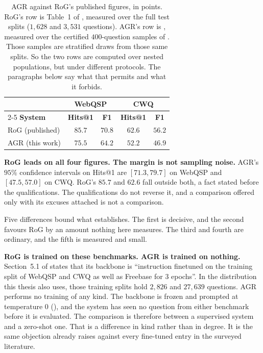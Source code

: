 \begin{table}[!tb]
  \begin{center}
    \caption[AGR against RoG's published figures]{AGR against RoG's published
    figures, in points. RoG's row is Table~1 of \cite{luo2024reasoning},
    measured over the full test splits ($1{,}628$ and $3{,}531$ questions).
    AGR's row is , measured over the certified $400$-question
    samples of . Those samples are stratified draws from
    those same splits. So the two rows are computed over nested populations, but
    under different protocols. The paragraphs below say what that permits and
    what it forbids.}
    \label{tab:rog}
    \small
    \begin{tabular}{|l|c|c|c|c|}
      \hline
      & \multicolumn{2}{c|}{\textbf{WebQSP}} & \multicolumn{2}{c|}{\textbf{CWQ}}
      \\
      \cline{2-5}
      \textbf{System} & \textbf{Hits@1} & \textbf{F1} & \textbf{Hits@1} &
                      \textbf{F1} \\
      \hline
      RoG (published)  & $85.7$ & $70.8$ & $62.6$ & $56.2$ \\
      \hline
      AGR (this work)  & $75.5$ & $64.2$ & $52.2$ & $46.9$ \\
      \hline
    \end{tabular}
  \end{center}
\end{table}

\textbf{RoG leads on all four figures. The margin is not sampling noise.} AGR's
$95\%$ confidence intervals on Hits@1 are $[71.3, 79.7]$ on WebQSP and $[47.5,
57.0]$ on CWQ. RoG's $85.7$ and $62.6$ fall outside both, a fact stated before
the qualifications. The qualifications do not reverse it, and a comparison
offered only with its excuses attached is not a comparison.

Five differences bound what  establishes. The first is decisive,
and the second favours RoG by an amount nothing here measures. The third and
fourth are ordinary, and the fifth is measured and small.

\textbf{RoG is trained on these benchmarks. AGR is trained on nothing.}
Section~5.1 of \cite{luo2024reasoning} states that its backbone is ``instruction
finetuned on the training split of WebQSP and CWQ as well as Freebase for 3
epochs''. In the distribution this thesis also uses, those training splits hold
$2{,}826$ and $27{,}639$ questions. AGR performs no training of any kind. The
backbone is frozen and prompted at temperature $0$ (), and
the system has seen no question from either benchmark before it is evaluated.
The comparison is therefore between a supervised system and a zero-shot one.
That is a difference in kind rather than in degree. It is the same objection
 already raises against every fine-tuned entry in the
surveyed literature.

